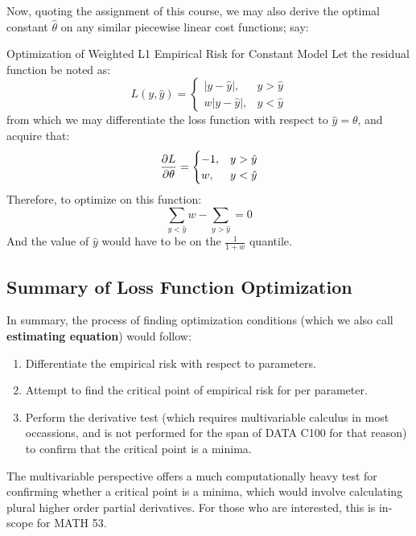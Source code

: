 Now, quoting the assignment of this course, we may also derive the optimal constant $\hat{\theta}$ on any similar piecewise linear cost functions; say:
\begin{ln-derive}{Optimization of Weighted L1 Empirical Risk for Constant Model}{}
    Let the residual function be noted as:
    \[
        L(y, \hat{y})
         = 
        \begin{cases}
            |y - \hat{y}|, &y > \hat{y} \\
            w|y - \hat{y}|, &y < \hat{y}
        \end{cases}
    \]
    from which we may differentiate the loss function with respect to $\hat{y} = \theta$, and acquire that:
    \[
        \pdv{L}{\theta}(y, \hat{y})
         = 
        \begin{cases}
            -1, &y > \hat{y} \\
            w, &y < \hat{y}
        \end{cases}
    \]
    Therefore, to optimize on this function:
    \[
        \sum_{y < \hat{y}}w - \sum_{y > \hat{y}} = 0
    \]
    And the value of $\hat{y}$ would have to be on the $\frac{1}{1 + w}$ quantile.
\end{ln-derive}

\subsection{Summary of Loss Function Optimization}
In summary, the process of finding optimization conditions (which we also call \textbf{estimating equation}) would follow:
\begin{enumerate}
    \item Differentiate the empirical risk with respect to parameters.
    \item Attempt to find the critical point of empirical risk for per parameter.
    \item Perform the derivative test (which requires multivariable calculus in most occassions, and is not performed for the span of DATA C100 for that reason) to confirm that the critical point is a minima.
\end{enumerate}
The multivariable perspective offers a much computationally heavy test for confirming whether a critical point is a minima, which would involve calculating plural higher order partial derivatives. For those who are interested, this is in-scope for MATH 53.


